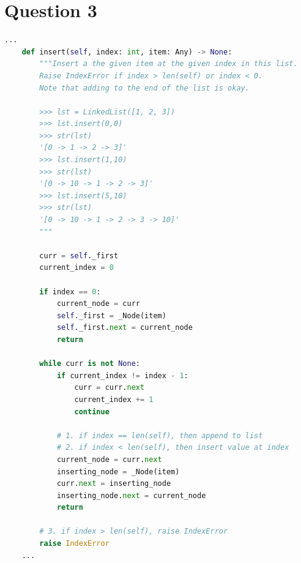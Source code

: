 \documentclass[12pt]{article}
\begin{document}
\section*{Question 3}
\begin{lstlisting}[language=Python,caption={worksheet\_12\_q3\_solution.py},captionpos=b]
    ...
    def insert(self, index: int, item: Any) -> None:
        """Insert a the given item at the given index in this list.
        Raise IndexError if index > len(self) or index < 0.
        Note that adding to the end of the list is okay.

        >>> lst = LinkedList([1, 2, 3])
        >>> lst.insert(0,0)
        >>> str(lst)
        '[0 -> 1 -> 2 -> 3]'
        >>> lst.insert(1,10)
        >>> str(lst)
        '[0 -> 10 -> 1 -> 2 -> 3]'
        >>> lst.insert(5,10)
        >>> str(lst)
        '[0 -> 10 -> 1 -> 2 -> 3 -> 10]'
        """

        curr = self._first
        current_index = 0

        if index == 0:
            current_node = curr
            self._first = _Node(item)
            self._first.next = current_node
            return

        while curr is not None:
            if current_index != index - 1:
                curr = curr.next
                current_index += 1
                continue

            # 1. if index == len(self), then append to list
            # 2. if index < len(self), then insert value at index
            current_node = curr.next
            inserting_node = _Node(item)
            curr.next = inserting_node
            inserting_node.next = current_node
            return

        # 3. if index > len(self), raise IndexError
        raise IndexError
    ...
\end{lstlisting}
\end{document}
